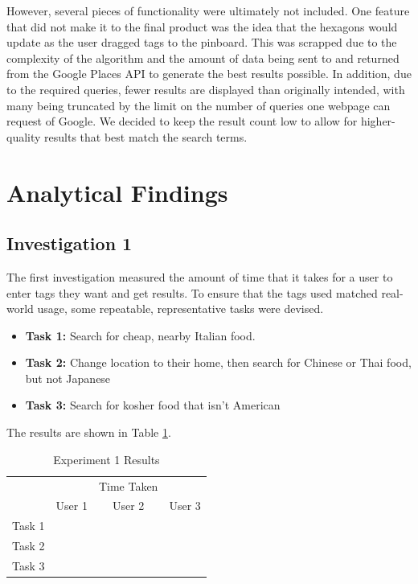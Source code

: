 \documentclass[10pt,a4paper]{article}
\begin{document}
However, several pieces of functionality were ultimately not included. One feature that did not make it to the final product was the idea that the hexagons would update as the user dragged tags to the pinboard. This was scrapped due to the complexity of the algorithm and the amount of data being sent to and returned from the Google Places API to generate the best results possible. In addition, due to the required queries, fewer results are displayed than originally intended, with many being truncated by the limit on the number of queries one webpage can request of Google. We decided to keep the result count low to allow for higher-quality results that best match the search terms.

\section*{Analytical Findings}
\subsection*{Investigation 1}

The first investigation measured the amount of time that it takes for a user to enter tags they want and get results. To ensure that the tags used matched real-world usage, some repeatable, representative tasks were devised.

\begin{itemize}
	\item \textbf{Task 1:} Search for cheap, nearby Italian food.
	\item \textbf{Task 2:} Change location to their home, then search for Chinese or Thai food, but not Japanese
	\item \textbf{Task 3:} Search for kosher food that isn’t American
\end{itemize}

The results are shown in Table \ref{table:experiment-1}.

\begin{table}[H]
\centering
\begin{tabular}{c|ccc|}
\cline{2-4}
                             &                             & Time Taken                  &        \\ \cline{2-4} 
                             & \multicolumn{1}{c|}{User 1} & \multicolumn{1}{c|}{User 2} & User 3 \\ \hline
\multicolumn{1}{|c|}{Task 1} & \multicolumn{1}{c|}{}       & \multicolumn{1}{c|}{}       &        \\ \hline
\multicolumn{1}{|c|}{Task 2} & \multicolumn{1}{c|}{}       & \multicolumn{1}{c|}{}       &        \\ \hline
\multicolumn{1}{|c|}{Task 3} & \multicolumn{1}{c|}{}       & \multicolumn{1}{c|}{}       &        \\ \hline
\end{tabular}
\caption{Experiment 1 Results \label{table:experiment-1}}
\end{table}
\end{document}
